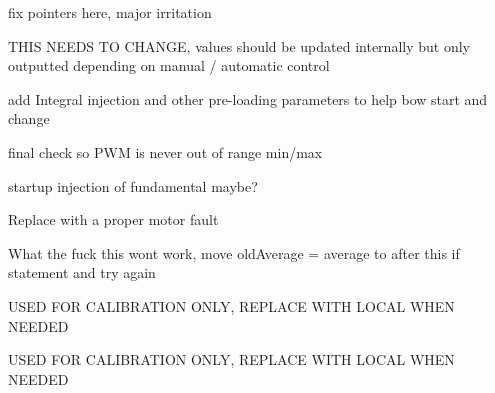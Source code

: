 
\begin{DoxyRefList}
\item[Member \mbox{\hyperlink{classstringModule_a52a5b213e054d030023de05b46769555}{string\+Module\+::add\+Bow}} (char motor\+Rev\+Pin, char motor\+Voltage\+Pin, char motor\+DCDCEn, char tacho\+Pin, char current\+Sense\+Pin, char motor\+Fault\+Pin, char step\+En\+Pin, char step\+Dir\+Pin, char step\+Step\+Pin, Hardware\+Serial $\ast$step\+Serial\+Port, char step\+Home\+Sensor\+Pin, char step\+Correction\+Sensor\+Pin)]\label{todo__todo000008}%
%
fix pointers here, major irritation  
\item[File \mbox{\hyperlink{bowcontrol_8cpp}{bowcontrol.cpp}} ]\label{todo__todo000001}%
%
THIS NEEDS TO CHANGE, values should be updated internally but only outputted depending on manual / automatic control  
\item[Member \mbox{\hyperlink{classbowControl_a51d03db7ff6ba45e3643b3cfb047c081}{bow\+Control\+::pid\+Control}} ()]\label{todo__todo000002}%
%
add Integral injection and other pre-\/loading parameters to help bow start and change 

final check so PWM is never out of range min/max 

startup injection of fundamental maybe?  
\item[Member \mbox{\hyperlink{classbowControl_ac763e2c7400be2248ffad2e13462d60a}{bow\+Control\+::update\+String}} ()]\label{todo__todo000003}%
%
Replace with a proper motor fault  
\item[Member \mbox{\hyperlink{classbowIO_a4f7ef490b19cc4d9d6e3bd2e65d77061}{bow\+IO\+::average\+Freq}} ()]\label{todo__todo000004}%
%
What the fuck this wont work, move old\+Average = average to after this if statement and try again  
\item[Member \mbox{\hyperlink{structCalibrationData_a9f72d0c5443474d421b40c9ff16c6941}{Calibration\+Data\+::max\+Speed\+PWM}} ]\label{todo__todo000006}%
%
USED FOR CALIBRATION ONLY, REPLACE WITH LOCAL WHEN NEEDED  
\item[Member \mbox{\hyperlink{structCalibrationData_a4fee79f4cad856d28f6372abc3aba90a}{Calibration\+Data\+::min\+Speed\+PWM}} ]\label{todo__todo000005}%
%
USED FOR CALIBRATION ONLY, REPLACE WITH LOCAL WHEN NEEDED 
\end{DoxyRefList}